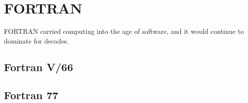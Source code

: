 \section{FORTRAN}

FORTRAN carried computing into the age of software, and it would
continue to dominate for decades.

\subsection{Fortran V/66}
\subsection{Fortran 77}

